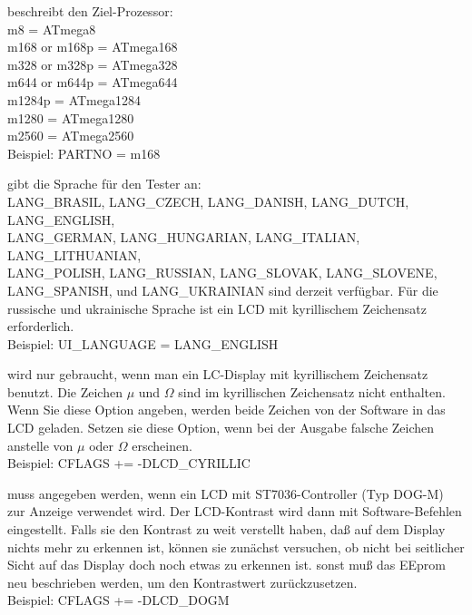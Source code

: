 \begin{description} \setlength{\itemsep}{0em}
  \item[PARTNO] beschreibt den Ziel-Prozessor:\\
         m8 = ATmega8\\
         m168 or m168p = ATmega168\\
         m328 or m328p = ATmega328\\
         m644 or m644p = ATmega644\\
         m1284p        = ATmega1284\\
         m1280         = ATmega1280\\
         m2560         = ATmega2560\\
    Beispiel: PARTNO = m168

  \item[UI\_LANGUAGE] gibt die Sprache für den Tester an:\\
    LANG\_BRASIL, LANG\_CZECH, LANG\_DANISH, LANG\_DUTCH, LANG\_ENGLISH, \\
    LANG\_GERMAN, LANG\_HUNGARIAN, LANG\_ITALIAN, LANG\_LITHUANIAN, \\
    LANG\_POLISH, LANG\_RUSSIAN, LANG\_SLOVAK, LANG\_SLOVENE, \\
    LANG\_SPANISH, und LANG\_UKRAINIAN sind derzeit verfügbar.
 Für die russische und ukrainische Sprache ist ein LCD mit kyrillischem Zeichensatz erforderlich.\\
    Beispiel: UI\_LANGUAGE = LANG\_ENGLISH

  \item[LCD\_CYRILLIC] wird nur gebraucht, wenn man ein LC-Display mit kyrillischem Zeichensatz benutzt.
Die Zeichen \(\mu\) und \(\Omega\) sind im kyrillischen Zeichensatz nicht enthalten.
Wenn Sie diese Option angeben, werden beide Zeichen von der Software in das LCD geladen.
Setzen sie diese Option, wenn bei der Ausgabe falsche Zeichen anstelle von \(\mu\) oder \(\Omega\) erscheinen.\\
Beispiel: CFLAGS += -DLCD\_CYRILLIC

  \item[LCD\_DOGM] muss angegeben werden, wenn ein LCD mit ST7036-Controller (Typ DOG-M) zur Anzeige verwendet wird.
Der LCD-Kontrast wird dann mit Software-Befehlen eingestellt.
Falls sie den Kontrast zu weit verstellt haben, daß auf dem Display nichts mehr zu erkennen ist,
können sie zunächst versuchen, ob nicht bei seitlicher Sicht auf das Display doch noch etwas zu erkennen ist.
sonst muß das EEprom neu beschrieben werden, um den Kontrastwert zurückzusetzen.\\
Beispiel: CFLAGS += -DLCD\_DOGM


\end{description}
